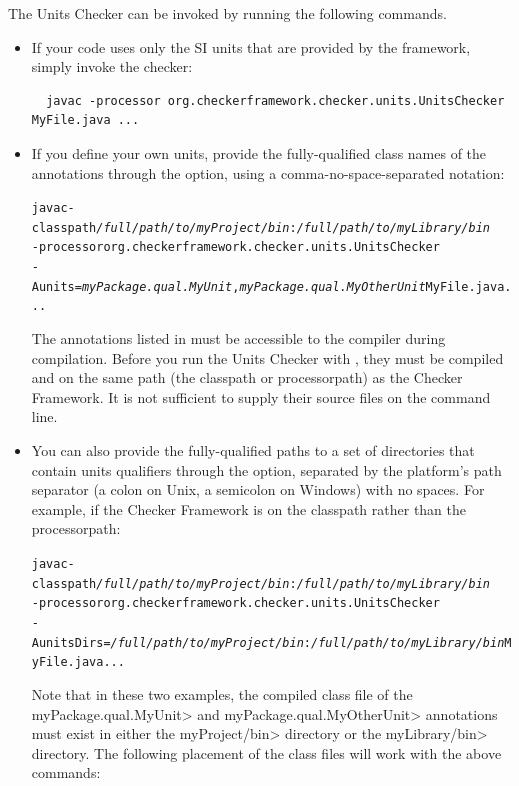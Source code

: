 
The Units Checker can be invoked by running the following commands.

\begin{itemize}
\item
If your code uses only the SI units that are provided by the
framework, simply invoke the checker:

\begin{Verbatim}
  javac -processor org.checkerframework.checker.units.UnitsChecker MyFile.java ...
\end{Verbatim}

\item
If you define your own units, provide the fully-qualified class names of the
annotations through the  option, using a comma-no-space-separated
notation:

\begin{alltt}
  javac -classpath \textit{/full/path/to/myProject/bin}:\textit{/full/path/to/myLibrary/bin} \ttbs
        -processor org.checkerframework.checker.units.UnitsChecker \ttbs
        -Aunits=\textit{myPackage.qual.MyUnit},\textit{myPackage.qual.MyOtherUnit} MyFile.java ...
\end{alltt}

The annotations listed in  must be accessible to
the compiler during compilation.  Before you run the Units Checker with
, they must be compiled and on the same path (the classpath or
processorpath) as the Checker Framework.  It
is not sufficient to supply their source files on the command line.

\item
You can also provide the fully-qualified paths to a set of directories
that contain units qualifiers through the  option,
separated by the platform's path separator (a colon on Unix, a semicolon
on Windows) with no spaces. For example,
if the Checker Framework is on the classpath rather than the processorpath:

\begin{alltt}
  javac -classpath \textit{/full/path/to/myProject/bin}:\textit{/full/path/to/myLibrary/bin} \ttbs
        -processor org.checkerframework.checker.units.UnitsChecker \ttbs
        -AunitsDirs=\textit{/full/path/to/myProject/bin}:\textit{/full/path/to/myLibrary/bin} MyFile.java ...
\end{alltt}

Note that in these two examples, the compiled class file of the
\<myPackage.qual.MyUnit> and \<myPackage.qual.MyOtherUnit> annotations
must exist in either the \<myProject/bin> directory or the
\<myLibrary/bin> directory. The following placement of the class files
will work with the above commands:


\end{itemize}
